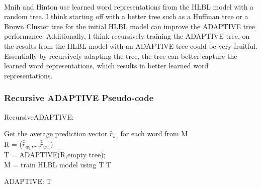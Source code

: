 \documentclass[12pt]{ociamthesis}  %
\begin{document}
\paragraph{}
Mnih and Hinton use learned word representations from the HLBL model with a random tree. I think starting off with a better tree such as a Huffman tree or a Brown Cluster tree for the initial HLBL model can improve the ADAPTIVE tree performance. Additionally, I think recursively training the ADAPTIVE tree, on the results from the HLBL model with an ADAPTIVE tree could be very fruitful. Essentially by recursively adapting the tree, the tree can better capture the learned word representations, which results in better learned word representations. 
\subsubsection{Recursive ADAPTIVE Pseudo-code}

\begin{algorithm}
\SetAlgoLined
RecursiveADAPTIVE: \\

 {
 	Get the average prediction vector $\bar{\hat{r}}_{w_i}$ for each word from M
 	\\R = ($\bar{\hat{r}}_{w_1}$,\dots,$\bar{\hat{r}}_{w_m}$)
	\\T = ADAPTIVE(R,empty tree);
	\\M = train HLBL model using T
}
\Return T
\end{algorithm}

\begin{algorithm}
\SetAlgoLined
ADAPTIVE:
\Return T
\end{algorithm}
\end{document}
